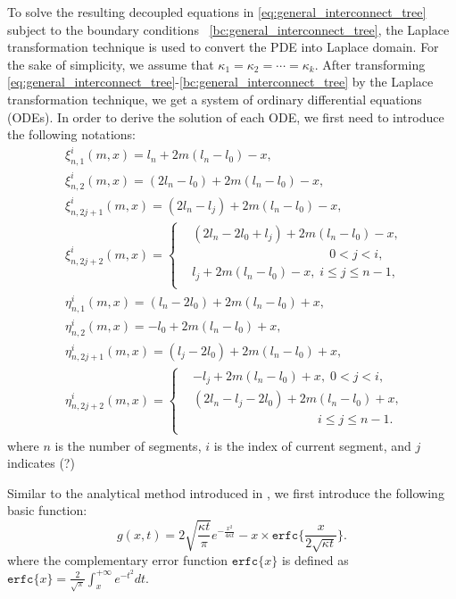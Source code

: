  To solve the resulting decoupled equations in
 \eqref{eq:general_interconnect_tree} subject to the boundary
 conditions ~\eqref{bc:general_interconnect_tree}, the Laplace
 transformation technique is used to convert the PDE into Laplace
 domain. For the sake of simplicity, we assume that
 $\kappa_1=\kappa_2=\cdots=\kappa_k$. After transforming
 \eqref{eq:general_interconnect_tree}-\eqref{bc:general_interconnect_tree}
 by the Laplace transformation technique, we get a system of ordinary
 differential equations (ODEs). In order to derive the solution of
 each ODE, we first need to introduce the following notations:
\begin{equation} \label{generalNotations}
\begin{split}
&\xi_{n,1}^{i}(m,x)=l_n+2m(l_n-l_0)-x,\\
&\xi_{n,2}^{i}(m,x)=(2l_n-l_0)+2m(l_n-l_0)-x,\\
&\xi_{n,2j+1}^{i}(m,x)=(2l_n-l_j)+2m(l_n-l_0)-x,\\
&\xi_{n,2j+2}^{i}(m,x)=\left\{
   \begin{aligned}
   &(2l_n-2l_0+l_j)+2m(l_n-l_0)-x,\;\\
   &\qquad\qquad\qquad\qquad\qquad\quad 0<j<i,  \\
   &l_j+2m(l_n-l_0)-x,\;i\leq j\leq n-1, \\
      \end{aligned}
   \right. \\
&\eta_{n,1}^{i}(m,x)=(l_n-2l_0)+2m(l_n-l_0)+x,\\
&\eta_{n,2}^{i}(m,x)=-l_0+2m(l_n-l_0)+x,\\
&\eta_{n,2j+1}^{i}(m,x)=(l_j-2l_0)+2m(l_n-l_0)+x,\\
&\eta_{n,2j+2}^{i}(m,x)=\left\{
   \begin{aligned}
   &-l_j+2m(l_n-l_0)+x,\;0<j<i,  \\
   &(2l_n-l_j-2l_0)+2m(l_n-l_0)+x,\; \\
   &\qquad\qquad\qquad\qquad\qquad i\leq j \leq n-1. \\
   \end{aligned}
   \right.
\end{split}
\end{equation}
where $n$ is the number of segments, $i$ is the index of current segment, and $j$ indicates (?)

Similar to the analytical method introduced in
\cite{ChenHuang:DAC'15}, we first introduce the following basic
function:
\begin{equation} \label{general_basisFunc}
g(x,t)=2\sqrt{\frac{\kappa t}{\pi}}e^{-\frac{x^2}{4\kappa
t}}-x\times\texttt{erfc}\{\frac{x}{2\sqrt{\kappa t}}\}.
\end{equation}
where the complementary error function $\texttt{erfc}\{x\}$ is defined
as
$\texttt{erfc}\{x\}=\frac{2}{\sqrt{\pi}}\int_x^{+\infty}e^{-t^2}dt$. 

